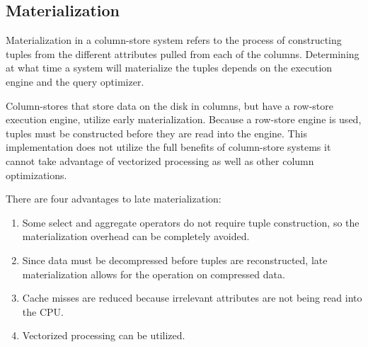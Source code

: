 \subsection*{Materialization}


Materialization in a column-store system refers to the process of constructing tuples from the different attributes pulled from each of the columns. Determining at what time a system will materialize the tuples depends on the execution engine and the query optimizer.


Column-stores that store data on the disk in columns, but have a row-store execution engine, utilize early materialization. Because a row-store engine is used, tuples must be constructed before they are read into the engine. This implementation does not utilize the full benefits of column-store systems it cannot take advantage of vectorized processing as well as other column optimizations.


There are four advantages to late materialization\cite{colvsrow}:


\begin{enumerate}
	\item Some select and aggregate operators do not require tuple construction, so the materialization overhead can be completely avoided.
	\item Since data must be decompressed before tuples are reconstructed, late materialization allows for the operation on compressed data.
	\item Cache misses are reduced because irrelevant attributes are not being read into the CPU.
	\item Vectorized processing can be utilized.
\end{enumerate}



